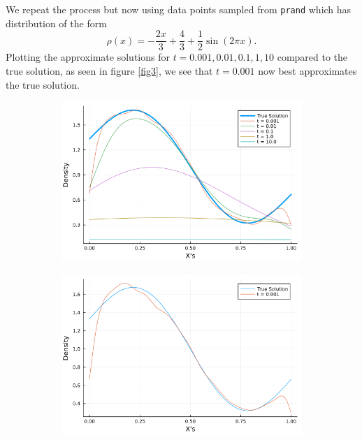 \documentclass[12pt]{report}
\begin{document}
\begin{solution}
    \noindent
    We repeat the process but now using data points sampled from \verb+prand+ which has distribution of the form
    \begin{equation}\label{weirdDataPoints}
      \rho(x) = -\frac{2x}{3} + \frac{4}{3} + \frac{1}{2}\sin(2\pi x).
    \end{equation}
    Plotting the approximate solutions for $t = 0.001,0.01,0.1,1,10$ compared to the true solution, as seen in figure \ref{fig3}, we see that $t=0.001$ now best approximates the true solution.
    

    \begin{figure}[H]
      \begin{subfigure}[b]{0.5\linewidth}
        \centering
        \includegraphics[width=\linewidth]{images/3b1.png}
        \caption{}
        \label{fig3:a}
        \vspace{4ex}
      \end{subfigure}%
      \begin{subfigure}[b]{0.5\linewidth}
        \centering
        \includegraphics[width=\linewidth]{images/3b2.png}

\end{subfigure}
\end{figure}
\end{solution}
\end{document}
